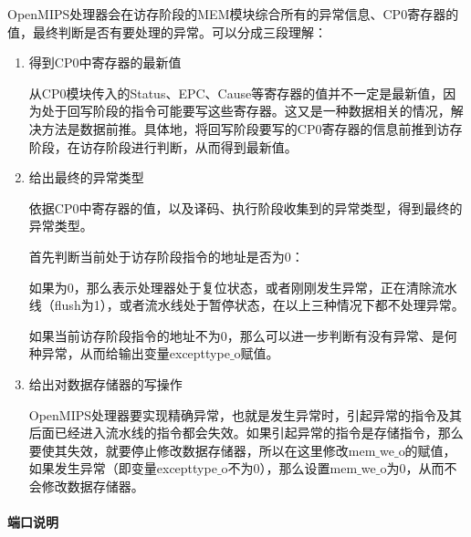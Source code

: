 OpenMIPS处理器会在访存阶段的MEM模块综合所有的异常信息、CP0寄存器的值，最终判断是否有要处理的异常。可以分成三段理解：

\begin{enumerate}[(1)]
	\item 得到CP0中寄存器的最新值
	
	从CP0模块传入的Status、EPC、Cause等寄存器的值并不一定是最新值，因为处于回写阶段的指令可能要写这些寄存器。这又是一种数据相关的情况，解决方法是数据前推。具体地，将回写阶段要写的CP0寄存器的信息前推到访存阶段，在访存阶段进行判断，从而得到最新值。
	
	\item 给出最终的异常类型
	
	依据CP0中寄存器的值，以及译码、执行阶段收集到的异常类型，得到最终的异常类型。
	
	首先判断当前处于访存阶段指令的地址是否为0：
	
	如果为0，那么表示处理器处于复位状态，或者刚刚发生异常，正在清除流水线（flush为1），或者流水线处于暂停状态，在以上三种情况下都不处理异常。
	
	如果当前访存阶段指令的地址不为0，那么可以进一步判断有没有异常、是何种异常，从而给输出变量excepttype$\_$o赋值。
	
	\item 给出对数据存储器的写操作
	
	OpenMIPS处理器要实现精确异常，也就是发生异常时，引起异常的指令及其后面已经进入流水线的指令都会失效。如果引起异常的指令是存储指令，那么要使其失效，就要停止修改数据存储器，所以在这里修改mem$\_$we$\_$o的赋值，如果发生异常（即变量excepttype$\_$o不为0），那么设置mem$\_$we$\_$o为0，从而不会修改数据存储器。
\end{enumerate}

\paragraph{端口说明}
\quad

